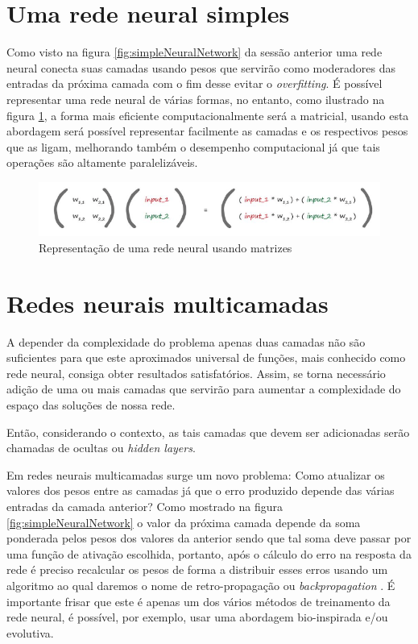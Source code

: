\begin{apendicesenv}
	\section{Uma rede neural simples}
		\par Como visto na figura \ref{fig:simpleNeuralNetwork} da sessão anterior uma rede neural conecta suas camadas usando pesos que servirão como moderadores das entradas da próxima camada com o fim desse evitar o \textit{overfitting}. É possível representar uma rede neural de várias formas, no entanto, como ilustrado na figura \ref{fig:matrixmultnn}, a forma mais eficiente computacionalmente será a matricial, usando esta abordagem será possível representar facilmente as camadas e os respectivos pesos que as ligam, melhorando também o desempenho computacional já que tais operações são altamente paralelizáveis.
		
		
		\begin{figure}[H]
			\centering
			\caption[Representação de uma rede neural usando matrizes]{Representação de uma rede neural usando matrizes}
			\label{fig:matrixmultnn}
			\includegraphics[width=0.7\linewidth]{images/TEMPMatrixMultNN}
		\end{figure}
		
	\section{Redes neurais multicamadas}
		\par A depender da complexidade do problema apenas duas camadas não são suficientes para que este aproximados universal de funções, mais conhecido como rede neural, consiga obter resultados satisfatórios. Assim, se torna necessário adição de uma ou mais camadas que servirão para aumentar a complexidade do espaço das soluções de nossa rede.
		
		\par Então, considerando o contexto, as tais camadas que devem ser adicionadas serão chamadas de ocultas ou \textit{hidden layers}\cite{rashid2016make}. 
		
		\par Em redes neurais multicamadas surge um novo problema: Como atualizar os valores dos pesos entre as camadas já que o erro produzido depende das várias entradas da camada anterior? Como mostrado na figura \ref{fig:simpleNeuralNetwork} o valor da próxima camada depende da soma ponderada pelos pesos dos valores da anterior sendo que tal soma deve passar por uma função de ativação escolhida, portanto, após o cálculo do erro na resposta da rede é preciso recalcular os pesos de forma a distribuir esses erros usando um algoritmo ao qual daremos o nome de retro-propagação ou \textit{backpropagation} \cite{haykinredes}. É importante frisar que este é apenas um dos vários métodos de treinamento da rede neural, é possível, por exemplo, usar uma abordagem bio-inspirada e/ou evolutiva.
		

\end{apendicesenv}
